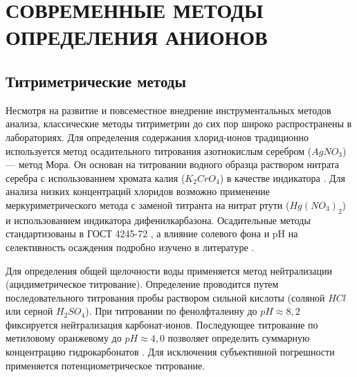 


\section{СОВРЕМЕННЫЕ МЕТОДЫ ОПРЕДЕЛЕНИЯ АНИОНОВ} %

\subsection{Титриметрические методы}

Несмотря на развитие и повсеместное внедрение инструментальных методов анализа, классические методы титриметрии до сих пор широко распространены в лабораториях. Для определения содержания хлорид-ионов традиционно используется метод осадительного титрования азотнокислым серебром ($AgNO_3$) — метод Мора. Он основан на титровании водного образца раствором нитрата серебра с использованием хромата калия ($K_2CrO_4$) в качестве индикатора \cite{ciapkaMethodologyDeterminingContent2023a}. Для анализа низких концентраций хлоридов возможно применение меркуриметрического метода с заменой титранта на нитрат ртути ($Hg(NO_3)_2$) и использованием индикатора дифенилкарбазона. Осадительные методы стандартизованы в ГОСТ 4245-72 \cite{ciapkaMethodologyDeterminingContent2023a}, а влияние солевого фона и pH на селективность осаждения подробно изучено в литературе \cite{saalidongExaminingDynamicsRelationship2022}.

Для определения общей щелочности воды применяется метод нейтрализации (ацидиметрическое титрование). Определение проводится путем последовательного титрования пробы раствором сильной кислоты (соляной $HCl$ или серной $H_2SO_4$). При титровании по фенолфталеину до $pH \approx 8,2$ фиксируется нейтрализация карбонат-ионов. Последующее титрование по метиловому оранжевому до $pH \approx 4,0$ позволяет определить суммарную концентрацию гидрокарбонатов \cite{saalidongExaminingDynamicsRelationship2022}. Для исключения субъективной погрешности применяется потенциометрическое титрование.

